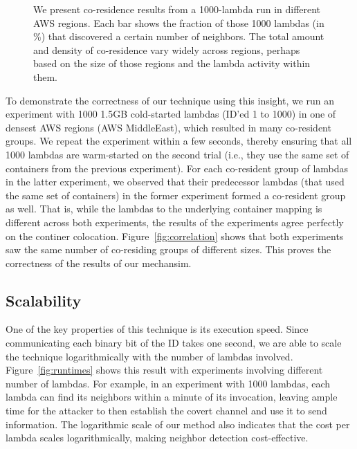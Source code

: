 \begin{figure}[!t]
\begin{subfigure}{.33\textwidth}
  \end{subfigure}
  \caption{We present co-residence results from a 1000-lambda run in different AWS regions. Each bar shows the fraction 
  of those 1000 lambdas (in \%) that discovered a certain number of neighbors. The total amount and density of co-residence 
  vary widely across regions, perhaps based on the size of those regions and the lambda activity within them. }
  \label{fig:awsregions}
  \end{figure}

To demonstrate the correctness of our technique using this insight, we run an
experiment with 1000 1.5GB cold-started lambdas (ID'ed 1 to 1000) in one of
densest AWS regions (AWS MiddleEast), which resulted in many co-resident groups.
We repeat the experiment within a few seconds, thereby ensuring that all 1000
lambdas are warm-started on the second trial (i.e., they use the same set of
containers from the previous experiment).  For each co-resident group of lambdas
in the latter experiment, we observed that their predecessor lambdas (that used
the same set of containers) in the former experiment formed a co-resident group
as well.  That is, while the lambdas to the underlying container mapping is
different across both experiments, the results of the experiments agree
perfectly on the continer colocation. Figure~\ref{fig:correlation} shows that
both experiments saw the same number of co-residing groups of different sizes.
This proves the correctness of the results of our mechansim.

\subsection{Scalability}
One of the key properties of this technique is its execution speed. Since
communicating each binary bit of the ID takes one second, we are able to scale
the technique logarithmically with the number of lambdas involved.
Figure~\ref{fig:runtimes} shows this result with experiments involving
different number of lambdas. For example, in an experiment with 1000 lambdas,
each lambda can find its neighbors within a minute of its invocation, leaving
ample time for the attacker to then establish the covert channel and use it to 
send information. The logarithmic scale of our method also indicates that the 
cost per lambda scales logarithmically, making neighbor detection cost-effective.




